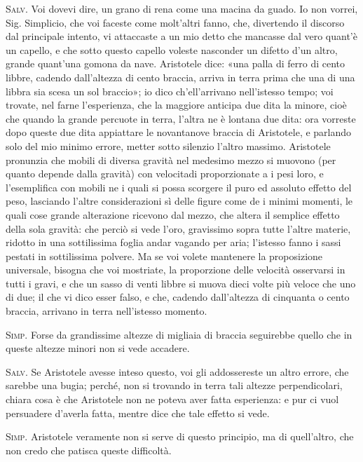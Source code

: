 \documentclass[11pt,twoside,openany]{book}
\newcommand{\speaker}[1]{\textcolor{rubric}{\textsc{#1}}\space}
\begin{document}
\speaker{Salv.} Voi dovevi dire, un grano di rena come una macina da guado. Io non vorrei, Sig. Simplicio, che voi faceste come molt'altri fanno, che, divertendo il discorso dal principale intento, vi attaccaste a un mio detto che mancasse dal vero quant'è un capello, e che sotto questo capello voleste nasconder un difetto d'un altro, grande quant'una gomona da nave. Aristotele dice: «una palla di ferro di cento libbre, cadendo dall'altezza di cento braccia, arriva in terra prima che una di una libbra sia scesa un sol braccio»; io dico ch'ell'arrivano nell'istesso tempo; voi trovate, nel farne l'esperienza, che la maggiore anticipa due dita la minore, cioè che quando la grande percuote in terra, l'altra ne è lontana due dita: ora vorreste dopo queste due dita appiattare le novantanove braccia di Aristotele, e parlando solo del mio minimo errore, metter sotto silenzio l'altro massimo. Aristotele pronunzia che mobili di diversa gravità nel medesimo mezzo si muovono (per quanto depende dalla gravità) con velocitadi proporzionate a i pesi loro, e l'esemplifica con mobili ne i quali si possa scorgere il puro ed assoluto effetto del peso, lasciando l'altre considerazioni sì delle figure come de i minimi momenti, le quali cose grande alterazione ricevono dal mezzo, che altera il semplice effetto della sola gravità: che perciò si vede l'oro, gravissimo sopra tutte l'altre materie, ridotto in una sottilissima foglia andar vagando per aria; l'istesso fanno i sassi pestati in sottilissima polvere. Ma se voi volete mantenere la proposizione universale, bisogna che voi mostriate, la proporzione delle velocità osservarsi in tutti i gravi, e che un sasso di venti libbre si muova dieci volte più veloce che uno di due; il che vi dico esser falso, e che, cadendo dall'altezza di cinquanta o cento braccia, arrivano in terra nell'istesso momento.

\speaker{Simp.} Forse da grandissime altezze di migliaia di braccia seguirebbe quello che in queste altezze minori non si vede accadere.

\speaker{Salv.} Se Aristotele avesse inteso questo, voi gli addossereste un altro errore, che sarebbe una bugia; perché, non si trovando in terra tali altezze perpendicolari, chiara cosa è che Aristotele non ne poteva aver fatta esperienza: e pur ci vuol persuadere d'averla fatta, mentre dice che tale effetto si vede.

\speaker{Simp.} Aristotele veramente non si serve di questo principio, ma di quell'altro, che non credo che patisca queste difficoltà.
\end{document}
